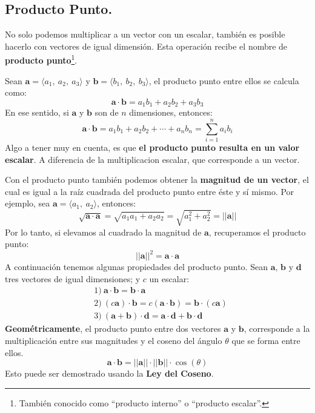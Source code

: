 \documentclass[12pt]{article}
\begin{document}
\subsection{Producto Punto.}

No solo podemos multiplicar a un vector con un escalar, también es posible hacerlo con vectores de igual dimensión. Esta operación recibe el nombre de \textbf{producto punto}\footnote{También conocido como ``producto interno'' o ``producto escalar''.}.

Sean $\mathbf{a} = \langle a_{1}, \ a_{2}, \ a_{3} \rangle$ y $\mathbf{b} = \langle b_{1}, \ b_{2}, \ b_{3} \rangle$, el producto punto entre ellos se calcula como:
\[
  \mathbf{a} \cdot \mathbf{b} = a_{1}b_{1} + a_{2}b_{2} + a_{3}b_{3}
\]
En ese sentido, si $\mathbf{a}$ y $\mathbf{b}$ son de $n$ dimensiones, entonces:
\[
  \mathbf{a} \cdot \mathbf{b} = a_{1}b_{1} + a_{2}b_{2} + \cdots + a_{n}b_{n} = \sum_{i = 1}^{n} a_{i}b_{i}
\]
Algo a tener muy en cuenta, es que \textbf{el producto punto resulta en un valor escalar}. A diferencia de la multiplicacion escalar, que corresponde a un vector.

Con el producto punto también podemos obtener la \textbf{magnitud de un vector}, el cual es igual a la raíz cuadrada del producto punto entre éste y sí mismo. Por ejemplo, sea $\mathbf{a} = \langle a_{1}, \ a_{2} \rangle$, entonces:
\[
  \sqrt{\mathbf{a} \cdot \mathbf{a}} = \sqrt{a_{1}a_{1} + a_{2}a_{2}} = \sqrt{a_{1}^{2} + a_{2}^{2}} = ||\mathbf{a}||
\]
Por lo tanto, si elevamos al cuadrado la magnitud de $\mathbf{a}$, recuperamos el producto punto:
\[
  ||\mathbf{a}||^{2} = \mathbf{a} \cdot \mathbf{a}
\]
A continuación tenemos algunas propiedades del producto punto. Sean $\mathbf{a}$, $\mathbf{b}$ y $\mathbf{d}$ tres vectores de igual dimensiones; y $c$ un escalar:
\begin{align*}
& 1) \ \mathbf{a} \cdot \mathbf{b} = \mathbf{b} \cdot \mathbf{a} \\
& 2) \ (c\mathbf{a}) \cdot \mathbf{b} = c(\mathbf{a} \cdot \mathbf{b}) = \mathbf{b} \cdot (c \mathbf{a}) \\
& 3) \ (\mathbf{a} + \mathbf{b}) \cdot \mathbf{d} = \mathbf{a} \cdot \mathbf{d} + \mathbf{b} \cdot \mathbf{d}
\end{align*}
\textbf{Geométricamente}, el producto punto entre dos vectores $\mathbf{a}$ y $\mathbf{b}$, corresponde a la multiplicación entre sus magnitudes y el coseno del ángulo $\theta$ que se forma entre ellos.
\[
  \mathbf{a} \cdot \mathbf{b} = ||\mathbf{a}|| \cdot ||\mathbf{b}|| \cdot \cos(\theta)
\]
Esto puede ser demostrado usando la \textbf{Ley del Coseno}.
\end{document}
